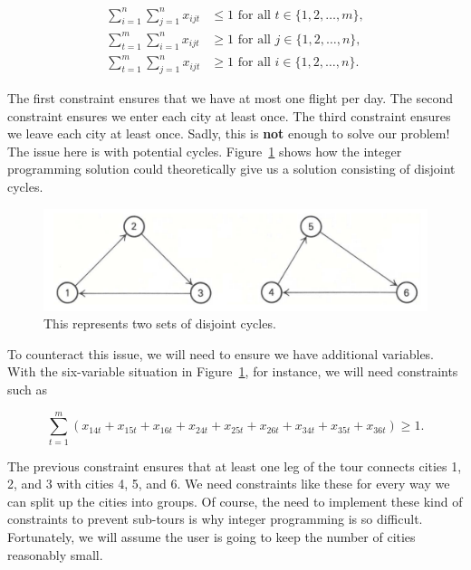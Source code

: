 \documentclass{article}
\begin{document}
\begin{align}
\sum_{i=1}^{n} \sum_{j=1}^{n} x_{ijt} &\le 1 \mbox{ for all } t \in \{1, 2, \ldots, m\}, \\ 
\sum_{t=1}^{m} \sum_{i=1}^{n} x_{ijt} &\ge 1 \mbox{ for all } j \in \{1, 2, \ldots, n\}, \\
\sum_{t=1}^{m} \sum_{j=1}^{n} x_{ijt} &\ge 1 \mbox{ for all } i \in \{1, 2, \ldots, n\}.
\end{align}

The first constraint ensures that we have at most one flight per day. The second constraint ensures we enter each city at least once. The third
constraint ensures we leave each city at least once. Sadly, this is \textbf{not} enough to solve our problem! The issue here is with potential cycles.
Figure~\ref{fig:bad_solution} shows how the integer programming solution could theoretically give us a solution consisting of disjoint cycles.

\begin{figure}[t]
\vskip 0.2in
\begin{center}
\centerline{\includegraphics[width=\columnwidth]{bad_solution}}
\caption{This represents two sets of disjoint cycles.}
\label{fig:bad_solution}
\end{center}
\vskip -0.2in
\end{figure}

To counteract this issue, we will need to ensure we have additional variables. With the six-variable situation in Figure~\ref{fig:bad_solution}, for
instance, we will need constraints such as

\begin{equation}
\sum_{t=1}^{m} (x_{14t} + x_{15t} + x_{16t} + x_{24t} + x_{25t} + x_{26t} + x_{34t} + x_{35t} + x_{36t}) \ge 1.
\end{equation}

The previous constraint ensures that at least one leg of the tour connects cities 1, 2, and 3 with cities 4, 5, and 6. We need constraints like these
for every way we can split up the cities into groups. Of course, the need to implement these kind of constraints to prevent sub-tours is why integer
programming is so difficult. Fortunately, we will assume the user is going to keep the number of cities reasonably small.
\end{document}
